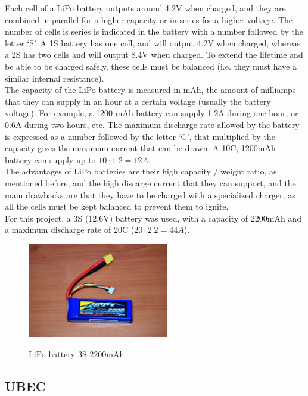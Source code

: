  Each cell of a LiPo battery outputs around 4.2V when charged, and they are combined in parallel for a higher capacity or in series for a higher voltage. The number of cells is series is indicated in the battery with a number followed by the letter `S'. A 1S battery has one cell, and will output 4.2V when charged, whereas a 2S has two cells and will output 8.4V when charged. To extend the lifetime and be able to be charged safely, these cells must be balanced (i.e. they must have a similar internal resistance).\\
 
The capacity of the LiPo battery is measured in mAh, the amount of milliamps that they can supply in an hour at a certain voltage (usually the battery voltage). For example, a 1200 mAh battery can supply 1.2A during one hour, or 0.6A during two hours, etc. The maximum discharge rate allowed by the battery is expressed as a number followed by the letter `C', that multiplied by the capacity gives the maximum current that can be drawn. A 10C, 1200mAh battery can supply up to $10 \cdot 1.2 = 12A$.\\

The advantages of LiPo batteries are their high capacity / weight ratio, as mentioned before, and the high discarge current that they can support, and the main drawbacks are that they have to be charged with a specialized charger, as all the cells must be kept balanced to prevent them to ignite.\\

For this project, a 3S (12.6V) battery was used, with a capacity of 2200mAh and a maximum discharge rate of 20C ($20 \cdot 2.2 = 44A$).

\begin{figure}[h]
		\centering
        \includegraphics[width=0.55\textwidth]{images/Hardware_lipo.jpg}\\
        \caption{LiPo battery 3S 2200mAh}
        \label{fig:hardware_lipo}
\end{figure}

\subsection{UBEC}


